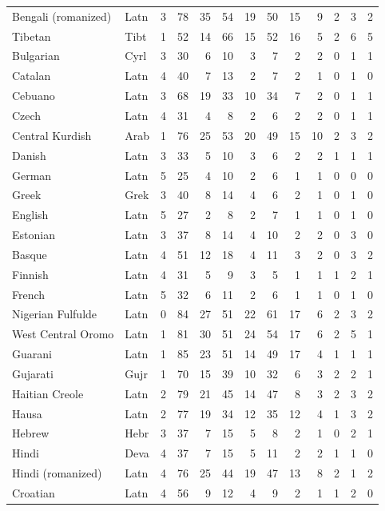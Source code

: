 \begin{small}
\begin{longtable}{llrrrrrrrrrrr}
Bengali (romanized) & Latn & 3 & 78 & 35 & 54 & 19 & 50 & 15 & 9 & 2 & 3 & 2 \\
Tibetan & Tibt & 1 & 52 & 14 & 66 & 15 & 52 & 16 & 5 & 2 & 6 & 5 \\
Bulgarian & Cyrl & 3 & 30 & 6 & 10 & 3 & 7 & 2 & 2 & 0 & 1 & 1 \\
Catalan & Latn & 4 & 40 & 7 & 13 & 2 & 7 & 2 & 1 & 0 & 1 & 0 \\
Cebuano & Latn & 3 & 68 & 19 & 33 & 10 & 34 & 7 & 2 & 0 & 1 & 1 \\
Czech & Latn & 4 & 31 & 4 & 8 & 2 & 6 & 2 & 2 & 0 & 1 & 1 \\
Central Kurdish & Arab & 1 & 76 & 25 & 53 & 20 & 49 & 15 & 10 & 2 & 3 & 2 \\
Danish & Latn & 3 & 33 & 5 & 10 & 3 & 6 & 2 & 2 & 1 & 1 & 1 \\
German & Latn & 5 & 25 & 4 & 10 & 2 & 6 & 1 & 1 & 0 & 0 & 0 \\
Greek & Grek & 3 & 40 & 8 & 14 & 4 & 6 & 2 & 1 & 0 & 1 & 0 \\
English & Latn & 5 & 27 & 2 & 8 & 2 & 7 & 1 & 1 & 0 & 1 & 0 \\
Estonian & Latn & 3 & 37 & 8 & 14 & 4 & 10 & 2 & 2 & 0 & 3 & 0 \\
Basque & Latn & 4 & 51 & 12 & 18 & 4 & 11 & 3 & 2 & 0 & 3 & 2 \\
Finnish & Latn & 4 & 31 & 5 & 9 & 3 & 5 & 1 & 1 & 1 & 2 & 1 \\
French & Latn & 5 & 32 & 6 & 11 & 2 & 6 & 1 & 1 & 0 & 1 & 0 \\
Nigerian Fulfulde & Latn & 0 & 84 & 27 & 51 & 22 & 61 & 17 & 6 & 2 & 3 & 2 \\
West Central Oromo & Latn & 1 & 81 & 30 & 51 & 24 & 54 & 17 & 6 & 2 & 5 & 1 \\
Guarani & Latn & 1 & 85 & 23 & 51 & 14 & 49 & 17 & 4 & 1 & 1 & 1 \\
Gujarati & Gujr & 1 & 70 & 15 & 39 & 10 & 32 & 6 & 3 & 2 & 2 & 1 \\
Haitian Creole & Latn & 2 & 79 & 21 & 45 & 14 & 47 & 8 & 3 & 2 & 3 & 2 \\
Hausa & Latn & 2 & 77 & 19 & 34 & 12 & 35 & 12 & 4 & 1 & 3 & 2 \\
Hebrew & Hebr & 3 & 37 & 7 & 15 & 5 & 8 & 2 & 1 & 0 & 2 & 1 \\
Hindi & Deva & 4 & 37 & 7 & 15 & 5 & 11 & 2 & 2 & 1 & 1 & 0 \\
Hindi (romanized) & Latn & 4 & 76 & 25 & 44 & 19 & 47 & 13 & 8 & 2 & 1 & 2 \\
Croatian & Latn & 4 & 56 & 9 & 12 & 4 & 9 & 2 & 1 & 1 & 2 & 0 \\

\end{longtable}
\end{small}

